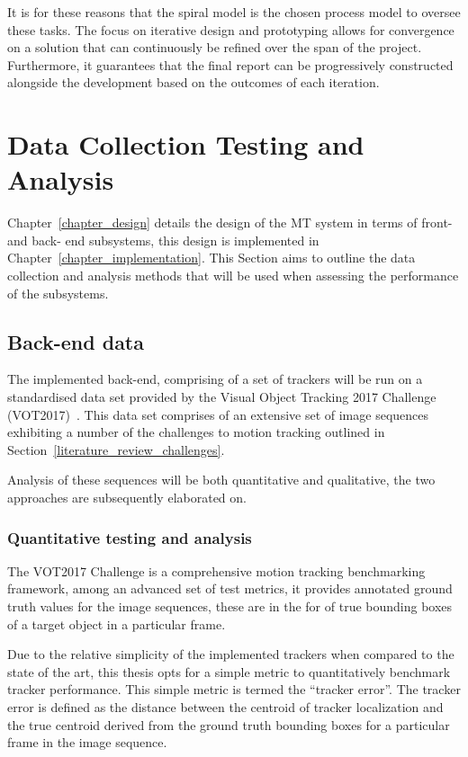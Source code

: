 It is for these reasons that the spiral model is the chosen process model to
oversee these tasks. The focus on iterative design and prototyping allows for
convergence on a solution that can continuously be refined over the span of the
project. Furthermore, it guarantees that the final report can be progressively
constructed alongside the development based on the outcomes of each iteration.

\section{Data Collection Testing and Analysis}\label{methodology_testing}
Chapter~\ref{chapter_design} details the design of the MT system in terms of
front- and back- end subsystems, this design is implemented in
Chapter~\ref{chapter_implementation}. This Section aims to outline the data
collection and analysis methods that will be used when assessing the
performance of the subsystems.

\subsection{Back-end data}
The implemented back-end, comprising of a set of trackers will be run on a
standardised data set provided by the Visual Object Tracking 2017 Challenge
(VOT2017)~\cite{VOT2017}. This data set comprises of an extensive set of image
sequences exhibiting a number of the challenges to motion tracking outlined in
Section~\ref{literature_review_challenges}. 

Analysis of these sequences will be both quantitative and qualitative, the two
approaches are subsequently elaborated on.

\subsubsection{Quantitative testing and analysis}
The VOT2017 Challenge is a comprehensive motion tracking benchmarking framework,
among an advanced set of test metrics, it provides annotated ground truth values for the
image sequences, these are in the for of true bounding boxes of a target object in a
particular frame. 

Due to the relative simplicity of the implemented trackers when compared to the
state of the art, this thesis opts for a simple metric to quantitatively
benchmark tracker performance. This simple metric is termed the ``tracker error''.
The tracker error is defined as the distance between the centroid of tracker
localization and the true centroid derived from the ground truth bounding boxes
for a particular frame in the image sequence.

